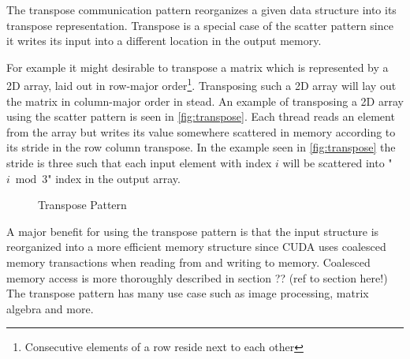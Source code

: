 The transpose communication pattern reorganizes a given data structure into its transpose representation.
Transpose is a special case of the scatter pattern since it writes its input into a different location in the output memory.

For example it might desirable to transpose a matrix which is represented by a 2D array, laid out in row-major order\footnote{Consecutive elements of a row reside next to each other}.
Transposing such a 2D array will lay out the matrix in column-major order in stead.
An example of transposing a 2D array using the scatter pattern is seen in \autoref{fig:transpose}.
Each thread reads an element from the array but writes its value somewhere scattered in memory according to its stride in the row column transpose.
In the example seen in \autoref{fig:transpose} the stride is three such that each input element with index $i$ will be scattered into "$i\bmod 3$" index in the output array.
\begin{figure}[ht]
	\centering
	\caption{Transpose Pattern}
	\label{fig:transpose}
\end{figure}
A major benefit for using the transpose pattern is that the input structure is reorganized into a more efficient memory structure since CUDA uses coalesced memory transactions when reading from and writing to memory.
Coalesced memory access is more thoroughly described in section ?? (ref to section here!)
The transpose pattern has many use case such as image processing, matrix algebra and more.